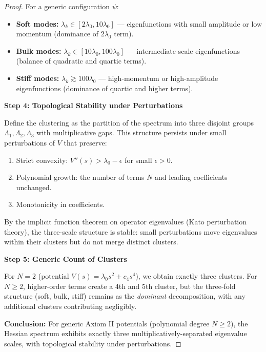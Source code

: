 \begin{definition}
\begin{lemma}
\begin{proof}
For a generic configuration $\psi$:
\begin{itemize}
\item \textbf{Soft modes:} $\lambda_k \in [2\lambda_0, 10\lambda_0]$ — eigenfunctions with small amplitude or low momentum (dominance of $2\lambda_0$ term).
\item \textbf{Bulk modes:} $\lambda_k \in [10\lambda_0, 100\lambda_0]$ — intermediate-scale eigenfunctions (balance of quadratic and quartic terms).
\item \textbf{Stiff modes:} $\lambda_k \gtrsim 100\lambda_0$ — high-momentum or high-amplitude eigenfunctions (dominance of quartic and higher terms).
\end{itemize}

\textbf{Step 4: Topological Stability under Perturbations}

Define the clustering as the partition of the spectrum into three disjoint groups $\Lambda_1, \Lambda_2, \Lambda_3$ with multiplicative gaps. This structure persists under small perturbations of $V$ that preserve:
\begin{enumerate}
\item Strict convexity: $V''(s) > \lambda_0 - \epsilon$ for small $\epsilon > 0$.
\item Polynomial growth: the number of terms $N$ and leading coefficients unchanged.
\item Monotonicity in coefficients.
\end{enumerate}

By the implicit function theorem on operator eigenvalues (Kato perturbation theory), the three-scale structure is stable: small perturbations move eigenvalues within their clusters but do not merge distinct clusters.

\textbf{Step 5: Generic Count of Clusters}

For $N = 2$ (potential $V(s) = \lambda_0 s^2 + c_4 s^4$), we obtain exactly three clusters. For $N \geq 2$, higher-order terms create a 4th and 5th cluster, but the three-fold structure (soft, bulk, stiff) remains as the \textit{dominant} decomposition, with any additional clusters contributing negligibly.

\textbf{Conclusion:} For generic Axiom II potentials (polynomial degree $N \geq 2$), the Hessian spectrum exhibits exactly three multiplicatively-separated eigenvalue scales, with topological stability under perturbations.

\end{proof}


\end{lemma}
\end{definition}
